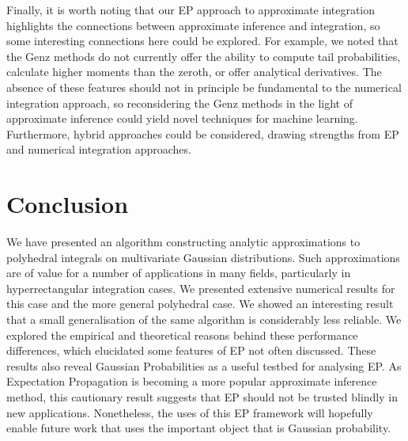 \documentclass[twoside,11pt]{article}
\begin{document}
Finally, it is worth noting that our EP approach to approximate integration highlights the connections between approximate inference and integration, so some interesting connections here could be explored.  For example, we noted that the Genz methods do not currently offer the ability to compute tail probabilities, calculate higher moments than the zeroth, or offer analytical derivatives.   The absence of these features should not in principle be fundamental to the numerical integration approach, so reconsidering the Genz methods in the light of approximate inference could yield novel techniques for machine learning.  Furthermore, hybrid approaches could be considered, drawing strengths from EP and numerical integration approaches.


\section{Conclusion}
\label{sec:conclusion}

We have presented an algorithm constructing analytic approximations to polyhedral integrals on multivariate Gaussian distributions. Such approximations are of value for a number of applications in many fields, particularly in hyperrectangular integration cases. We presented extensive numerical results for this case and the more general polyhedral case.  We showed an interesting result that a small generalisation of the same algorithm is considerably less reliable. We explored the empirical and theoretical reasons behind these performance differences, which elucidated some features of EP not often discussed.  These results also reveal Gaussian Probabilities as a useful testbed for analysing EP.  As Expectation Propagation is becoming a more popular approximate inference method, this cautionary result suggests that EP should not be trusted blindly in new applications. Nonetheless, the uses of this EP framework will hopefully enable future work that uses the important object that is Gaussian probability.


\end{document}
